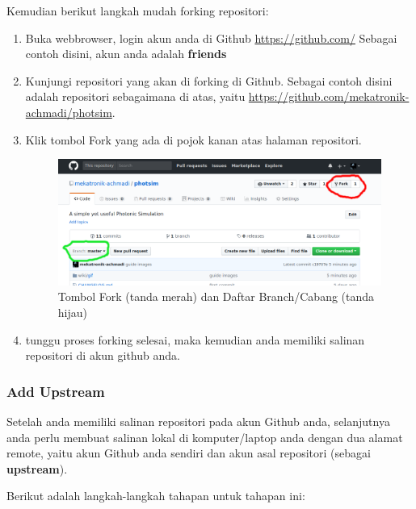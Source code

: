 \documentclass[12pt]{article}
\begin{document}
	Kemudian berikut langkah mudah forking repositori:
	
	\begin{enumerate}
		\item Buka webbrowser, login akun anda di Github \url{https://github.com/}
		Sebagai contoh disini, akun anda adalah \textbf{friends}
		\item Kunjungi repositori yang akan di forking di Github.
		Sebagai contoh disini adalah repositori sebagaimana di atas, yaitu \url{https://github.com/mekatronik-achmadi/photsim}.
		\item Klik tombol Fork yang ada di pojok kanan atas halaman repositori.
		 
		\begin{figure}[h!]
			\centering
			\captionsetup{justification=centering}
			\includegraphics[width=0.8\linewidth]{../images/png/fork_branch}
			\caption[Tombol Fork dan Branch]{\small{Tombol Fork (tanda merah) dan Daftar Branch/Cabang (tanda hijau)}}
		\end{figure}
	
		\item tunggu proses forking selesai, maka kemudian anda memiliki salinan repositori di akun github anda.
	 
	\end{enumerate}
	
	\subsubsection{Add Upstream}
	
	Setelah anda memiliki salinan repositori pada akun Github anda,
	selanjutnya anda perlu membuat salinan lokal di komputer/laptop anda dengan dua alamat remote,
	yaitu akun Github anda sendiri dan akun asal repositori (sebagai \textbf{upstream}).
	
	Berikut adalah langkah-langkah tahapan untuk tahapan ini:
	
\end{document}
